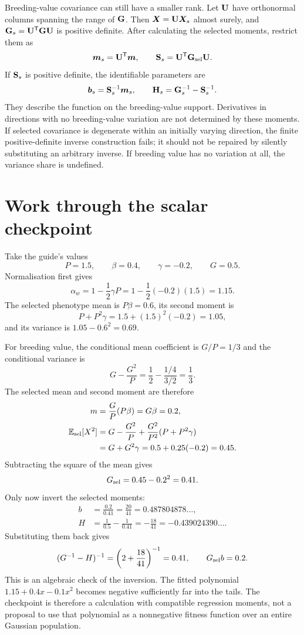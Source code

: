 Breeding-value covariance can still have a smaller rank. Let \(\mathbf{U}\)
have orthonormal columns spanning the range of \(\mathbf{G}\). Then
\(\boldsymbol{X}=\mathbf{U}\boldsymbol{X}_s\) almost surely, and
\(\mathbf{G}_s=\mathbf{U}^{\mathsf T}\mathbf{G}\mathbf{U}\) is positive definite.
After calculating the selected moments, restrict them as
\[
 \boldsymbol{m}_s=\mathbf{U}^{\mathsf T}\boldsymbol{m},\qquad
 \mathbf{S}_s=\mathbf{U}^{\mathsf T}\mathbf{G}_{\mathrm{sel}}\mathbf{U}.
\]
If \(\mathbf{S}_s\) is positive definite, the identifiable parameters are
\[
 \boldsymbol{b}_s=\mathbf{S}_s^{-1}\boldsymbol{m}_s,\qquad
 \mathbf{H}_s=\mathbf{G}_s^{-1}-\mathbf{S}_s^{-1}.
\]
They describe the function on the breeding-value support. Derivatives in
directions with no breeding-value variation are not determined by these
moments. If selected covariance is degenerate within an initially varying
direction, the finite positive-definite inverse construction fails; it
should not be repaired by silently substituting an arbitrary inverse.
If breeding value has no variation at all, the variance share is undefined.

\section{Work through the scalar checkpoint}
\label{conversion:scalar_example}

Take the guide's values
\[
 P=1.5,\qquad \beta=0.4,\qquad \gamma=-0.2,\qquad G=0.5.
\]
Normalisation first gives
\[
 \alpha_w=1-\frac12\gamma P
 =1-\frac12(-0.2)(1.5)=1.15.
\]
The selected phenotype mean is \(P\beta=0.6\), its second moment is
\[
 P+P^2\gamma=1.5+(1.5)^2(-0.2)=1.05,
\]
and its variance is \(1.05-0.6^2=0.69\).

For breeding value, the conditional mean coefficient is
\(G/P=1/3\) and the conditional variance is
\[
 G-\frac{G^2}{P}
 =\frac12-\frac{1/4}{3/2}
 =\frac13.
\]
The selected mean and second moment are therefore
\begin{align*}
 m&=\frac GP(P\beta)=G\beta=0.2,\\
 \mathbb E_{\rm sel}[X^2]
 &=G-\frac{G^2}{P}+\frac{G^2}{P^2}(P+P^2\gamma)\\
 &=G+G^2\gamma=0.5+0.25(-0.2)=0.45.
\end{align*}
Subtracting the square of the mean gives
\[
 G_{\rm sel}=0.45-0.2^2=0.41.
\]
Only now invert the selected moments:
\begin{align}
 b&=\frac{0.2}{0.41}=\frac{20}{41}
     =0.487804878\ldots,\nonumber\\
 H&=\frac1{0.5}-\frac1{0.41}
     =-\frac{18}{41}=-0.439024390\ldots.
 \label{conversion:scalar_numbers}
\end{align}
Substituting them back gives
\[
 (G^{-1}-H)^{-1}
 =\left(2+\frac{18}{41}\right)^{-1}=0.41,
 \qquad G_{\rm sel}b=0.2.
\]
This is an algebraic check of the inversion. The fitted polynomial
\(1.15+0.4x-0.1x^2\) becomes negative sufficiently far into the tails.
The checkpoint is therefore a calculation with compatible regression
moments, not a proposal to use that polynomial as a nonnegative fitness
function over an entire Gaussian population.

